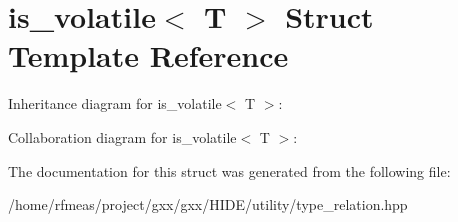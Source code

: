 \hypertarget{structis__volatile}{}\section{is\+\_\+volatile$<$ T $>$ Struct Template Reference}
\label{structis__volatile}


Inheritance diagram for is\+\_\+volatile$<$ T $>$\+:


Collaboration diagram for is\+\_\+volatile$<$ T $>$\+:


The documentation for this struct was generated from the following file\+:\begin{DoxyCompactItemize}
\item 
/home/rfmeas/project/gxx/gxx/\+H\+I\+D\+E/utility/type\+\_\+relation.\+hpp\end{DoxyCompactItemize}
